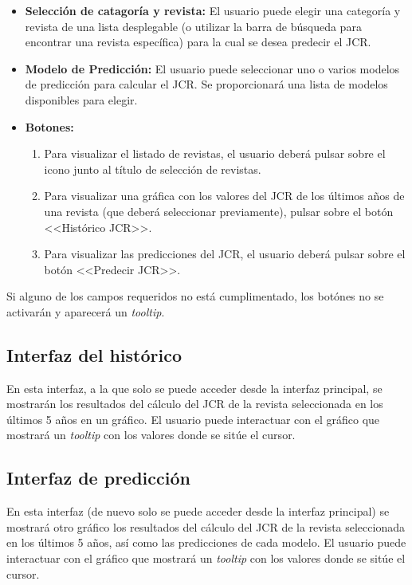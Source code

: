 \begin{itemize} 
\item \textbf{Selección de catagoría y revista:} El usuario puede elegir una categoría y revista de una lista desplegable (o utilizar la barra de búsqueda para encontrar una revista específica) para la cual se desea predecir el JCR.
\item \textbf{Modelo de Predicción:} El usuario puede seleccionar uno o varios modelos de predicción para calcular el JCR. Se proporcionará una lista de modelos disponibles para elegir.
\item \textbf{Botones:} 
\begin{enumerate}
    \item Para visualizar el listado de revistas, el usuario deberá pulsar sobre el icono junto al título de selección de revistas.
    \item Para visualizar una gráfica con los valores del JCR de los últimos años de una revista (que deberá seleccionar previamente), pulsar sobre el botón <<Histórico JCR>>.
    \item Para visualizar las predicciones del JCR, el usuario deberá pulsar sobre el botón <<Predecir JCR>>.
\end{enumerate}
\end{itemize}

Si alguno de los campos requeridos no está cumplimentado, los botónes no se activarán y aparecerá un \textit{tooltip}.

\subsection{Interfaz del histórico}
En esta interfaz, a la que solo se puede acceder desde la interfaz principal, se mostrarán los resultados del cálculo del JCR de la revista seleccionada en los últimos 5 años en un gráfico.  El usuario puede interactuar con el gráfico que mostrará un \textit{tooltip} con los valores donde se sitúe el cursor.

\subsection{Interfaz de predicción}
En esta interfaz (de nuevo solo se puede acceder desde la interfaz principal) se mostrará otro gráfico los resultados del cálculo del JCR de la revista seleccionada en los últimos 5 años, así como las predicciones de cada modelo. El usuario puede interactuar con el gráfico que mostrará un \textit{tooltip} con los valores donde se sitúe el cursor.

